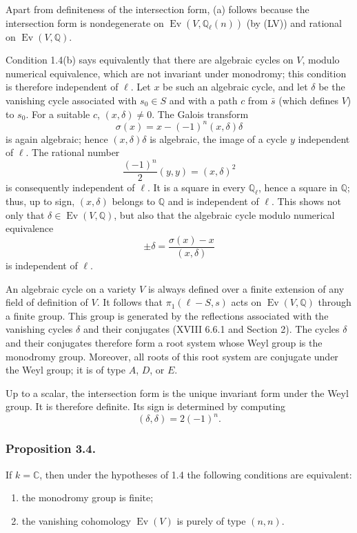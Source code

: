 Apart from definiteness of the intersection form, (a) follows because the
intersection form is nondegenerate on
$\operatorname{Ev}(V,\mathbb Q_\ell(n))$ (by (LV)) and rational on
$\operatorname{Ev}(V,\mathbb Q)$.

Condition 1.4(b) says equivalently that there are algebraic cycles on $V$,
modulo numerical equivalence, which are not invariant under monodromy; this
condition is therefore independent of $\ell$.  Let $x$ be such an algebraic
cycle, and let $\delta$ be the vanishing cycle associated with $s_0\in S$
and with a path $c$ from $\bar s$ (which defines $V$) to $s_0$.  For a
suitable $c$, $(x,\delta)\ne0$.  The Galois transform
\[
  \sigma(x)=x-(-1)^n(x,\delta)\delta
\]
is again algebraic; hence $(x,\delta)\delta$ is algebraic, the image of a
cycle $y$ independent of $\ell$.  The rational number
\[
  \frac{(-1)^n}{2}(y,y)=(x,\delta)^2
\]
is consequently independent of $\ell$.  It is a square in every
$\mathbb Q_\ell$, hence a square in $\mathbb Q$; thus, up to sign,
$(x,\delta)$ belongs to $\mathbb Q$ and is independent of $\ell$.  This
shows not only that $\delta\in\operatorname{Ev}(V,\mathbb Q)$, but also that
the algebraic cycle modulo numerical equivalence
\[
  \pm\delta=\frac{\sigma(x)-x}{(x,\delta)}
\]
is independent of $\ell$.

An algebraic cycle on a variety $V$ is always defined over a finite
extension of any field of definition of $V$.  It follows that
$\pi_1(\ell-S,s)$ acts on $\operatorname{Ev}(V,\mathbb Q)$ through a finite
group.  This group is generated by the reflections associated with the
vanishing cycles $\delta$ and their conjugates (XVIII 6.6.1 and Section 2).
The cycles $\delta$ and their conjugates therefore form a root system whose
Weyl group is the monodromy group.  Moreover, all roots of this root system
are conjugate under the Weyl group; it is of type $A$, $D$, or $E$.

Up to a scalar, the intersection form is the unique invariant form under
the Weyl group.  It is therefore definite.  Its sign is determined by
computing
\[
  (\delta,\delta)=2(-1)^n.
\]

\subsubsection*{Proposition 3.4.}
If $k=\mathbb C$, then under the hypotheses of 1.4 the following conditions
are equivalent:
\begin{enumerate}[label=(\roman*)]
\item the monodromy group is finite;
\item the vanishing cohomology $\operatorname{Ev}(V)$ is purely of type
  $(n,n)$.
\end{enumerate}

